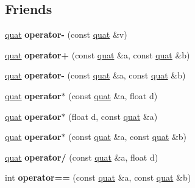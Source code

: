 \subsection*{Friends}
\begin{DoxyCompactItemize}
\item 
\hypertarget{classquat_a9466a3c3e5a85c936f467f275c721932}{\hyperlink{classquat}{quat} {\bfseries operator-\/} (const \hyperlink{classquat}{quat} \&v)}\label{classquat_a9466a3c3e5a85c936f467f275c721932}

\item 
\hypertarget{classquat_a235a2a11770cbc76e184c8211d640c0b}{\hyperlink{classquat}{quat} {\bfseries operator+} (const \hyperlink{classquat}{quat} \&a, const \hyperlink{classquat}{quat} \&b)}\label{classquat_a235a2a11770cbc76e184c8211d640c0b}

\item 
\hypertarget{classquat_ab215b6f784e4983b4bb71a9f42540b52}{\hyperlink{classquat}{quat} {\bfseries operator-\/} (const \hyperlink{classquat}{quat} \&a, const \hyperlink{classquat}{quat} \&b)}\label{classquat_ab215b6f784e4983b4bb71a9f42540b52}

\item 
\hypertarget{classquat_a795c816e68796b731cb52f01ced47638}{\hyperlink{classquat}{quat} {\bfseries operator$\ast$} (const \hyperlink{classquat}{quat} \&a, float d)}\label{classquat_a795c816e68796b731cb52f01ced47638}

\item 
\hypertarget{classquat_af51cecd97947dac527ea03cd6fe2a2ad}{\hyperlink{classquat}{quat} {\bfseries operator$\ast$} (float d, const \hyperlink{classquat}{quat} \&a)}\label{classquat_af51cecd97947dac527ea03cd6fe2a2ad}

\item 
\hypertarget{classquat_a3ac523542b36c05f475f9a45b7ce2014}{\hyperlink{classquat}{quat} {\bfseries operator$\ast$} (const \hyperlink{classquat}{quat} \&a, const \hyperlink{classquat}{quat} \&b)}\label{classquat_a3ac523542b36c05f475f9a45b7ce2014}

\item 
\hypertarget{classquat_a9c17217add9be473cadee03560304295}{\hyperlink{classquat}{quat} {\bfseries operator/} (const \hyperlink{classquat}{quat} \&a, float d)}\label{classquat_a9c17217add9be473cadee03560304295}

\item 
\hypertarget{classquat_a6fe03a2358666bc051e62896e7948f5c}{int {\bfseries operator==} (const \hyperlink{classquat}{quat} \&a, const \hyperlink{classquat}{quat} \&b)}\label{classquat_a6fe03a2358666bc051e62896e7948f5c}


\end{DoxyCompactItemize}
